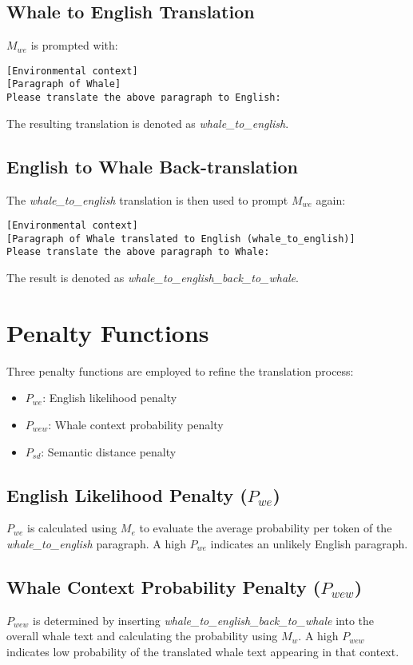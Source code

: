 \documentclass{article}
\begin{document}
\subsection{Whale to English Translation}
$M_{we}$ is prompted with:
\begin{verbatim}
[Environmental context]
[Paragraph of Whale]
Please translate the above paragraph to English:
\end{verbatim}

The resulting translation is denoted as \textit{whale\_to\_english}.

\subsection{English to Whale Back-translation}
The \textit{whale\_to\_english} translation is then used to prompt $M_{we}$ again:
\begin{verbatim}
[Environmental context]
[Paragraph of Whale translated to English (whale_to_english)]
Please translate the above paragraph to Whale:
\end{verbatim}

The result is denoted as \textit{whale\_to\_english\_back\_to\_whale}.

\section{Penalty Functions}
Three penalty functions are employed to refine the translation process:

\begin{itemize}
    \item $P_{we}$: English likelihood penalty
    \item $P_{wew}$: Whale context probability penalty
    \item $P_{sd}$: Semantic distance penalty
\end{itemize}

\subsection{English Likelihood Penalty ($P_{we}$)}
$P_{we}$ is calculated using $M_e$ to evaluate the average probability per token of the \textit{whale\_to\_english} paragraph. A high $P_{we}$ indicates an unlikely English paragraph.

\subsection{Whale Context Probability Penalty ($P_{wew}$)}
$P_{wew}$ is determined by inserting \textit{whale\_to\_english\_back\_to\_whale} into the overall whale text and calculating the probability using $M_w$. A high $P_{wew}$ indicates low probability of the translated whale text appearing in that context.
\end{document}
